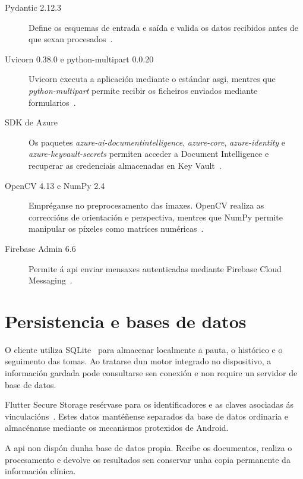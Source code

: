 \begin{description}
    \item[Pydantic 2.12.3] Define os esquemas de entrada e saída e valida os datos recibidos antes de que sexan procesados~\cite{PydanticDocumentation}.

    \item[Uvicorn 0.38.0 e python-multipart 0.0.20] Uvicorn executa a aplicación mediante o estándar \gls{asgi}, mentres que \textit{python-multipart} permite recibir os ficheiros enviados mediante formularios~\cite{UvicornDocumentation,PythonMultipartPackage}.

    \item[SDK de Azure] Os paquetes \textit{azure-ai-documentintelligence}, \textit{azure-core}, \textit{azure-identity} e \textit{azure-keyvault-secrets} permiten acceder a Document Intelligence e recuperar as credenciais almacenadas en Key Vault~\cite{AzureDocumentIntelligence,AzureKeyVault}.

    \item[OpenCV 4.13 e NumPy 2.4] Empréganse no preprocesamento das imaxes. OpenCV realiza as correccións de orientación e perspectiva, mentres que NumPy permite manipular os píxeles como matrices numéricas~\cite{OpenCVTransformations,NumPyDocumentation}.

    \item[Firebase Admin 6.6] Permite á \gls{api} enviar mensaxes autenticadas mediante Firebase Cloud Messaging~\cite{FirebaseAdminSDK}.
\end{description}

\section{Persistencia e bases de datos}

O cliente utiliza SQLite~\cite{SQLiteOfficial} para almacenar localmente a pauta, o histórico e o seguimento das tomas. Ao tratarse dun motor integrado no dispositivo, a información gardada pode consultarse sen conexión e non require un servidor de base de datos.

Flutter Secure Storage resérvase para os identificadores e as claves asociadas ás vinculacións~\cite{FlutterSecureStorage}. Estes datos mantéñense separados da base de datos ordinaria e almacénanse mediante os mecanismos protexidos de Android.

A \gls{api} non dispón dunha base de datos propia. Recibe os documentos, realiza o procesamento e devolve os resultados sen conservar unha copia permanente da información clínica.

